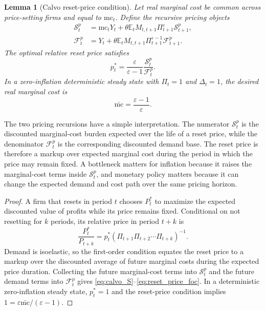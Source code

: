 ﻿\documentclass[12pt]{article}
\newtheorem{lemma}{Lemma}
\theoremstyle{remark}
\newcommand{\E}{\mathbb E}
\newcommand{\mc}{\mathrm{mc}}
\begin{document}
\begin{lemma}[Calvo reset-price condition]\label{lem:calvo_pricing}
Let real marginal cost be common across price-setting firms and equal to $\mc_t$. Define the
recursive pricing objects
\begin{align}
    \mathcal S_t^p
    &=
    \mc_tY_t
    +
    \theta\E_t M_{t,t+1}\Pi_{t+1}^{\varepsilon}\mathcal S_{t+1}^p,
    \label{eq:calvo_S}\\
    \mathcal F_t^p
    &=
    Y_t
    +
    \theta\E_t M_{t,t+1}\Pi_{t+1}^{\varepsilon-1}\mathcal F_{t+1}^p.
    \label{eq:calvo_F}
\end{align}
The optimal relative reset price satisfies
\begin{equation}
    p_t^*
    =
    \frac{\varepsilon}{\varepsilon-1}
    \frac{\mathcal S_t^p}{\mathcal F_t^p}.
    \label{eq:reset_price_foc}
\end{equation}
In a zero-inflation deterministic steady state with $\Pi_t=1$ and $\Delta_t=1$, the desired real
marginal cost is
\begin{equation}
    \bar{\mc}=\frac{\varepsilon-1}{\varepsilon}.
    \label{eq:ss_mc}
\end{equation}
\end{lemma}

The two pricing recursions have a simple interpretation. The numerator
$\mathcal S_t^p$ is the discounted marginal-cost burden expected over the life of a reset price,
while the denominator $\mathcal F_t^p$ is the corresponding discounted demand base. The reset
price is therefore a markup over expected marginal cost during the period in which the price may
remain fixed. A bottleneck matters for inflation because it raises the marginal-cost terms inside
$\mathcal S_t^p$, and monetary policy matters because it can change the expected demand and cost
path over the same pricing horizon.

\begin{proof}
A firm that resets in period $t$ chooses $P_t^*$ to maximize the expected discounted value of
profits while its price remains fixed. Conditional on not resetting for $k$ periods, its relative
price in period $t+k$ is
\[
    \frac{P_t^*}{P_{t+k}}
    =
    p_t^*
    \left(\Pi_{t+1}\Pi_{t+2}\cdots\Pi_{t+k}\right)^{-1}.
\]
Demand is isoelastic, so the first-order condition equates the reset price to a markup over the
discounted average of future marginal costs during the expected price duration. Collecting the
future marginal-cost terms into $\mathcal S_t^p$ and the future demand terms into
$\mathcal F_t^p$ gives \eqref{eq:calvo_S}--\eqref{eq:reset_price_foc}. In a deterministic
zero-inflation steady state, $p_t^*=1$ and the reset-price condition implies
$1=\varepsilon\bar{\mc}/(\varepsilon-1)$.
\end{proof}
\end{document}
